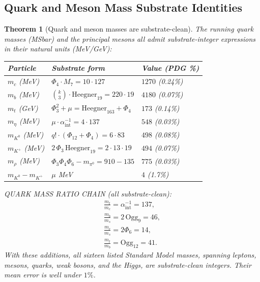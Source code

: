 \documentclass[11pt]{article}
\newtheorem{theorem}{Theorem}[section]
\begin{document}
\subsection{Quark and Meson Mass Substrate Identities}

\begin{theorem}[Quark and meson masses are substrate-clean]\label{thm:quark_meson}
The running quark masses (MSbar) and the principal mesons all admit
substrate-integer expressions in their natural units (MeV/GeV):
\begin{center}\small\begin{tabular}{lll}
\toprule
\textbf{Particle} & \textbf{Substrate form} & \textbf{Value (PDG \%)} \\
\midrule
$m_c$  (MeV) & $\Phi_4\cdot M_7 = 10\cdot 127$              & $1270$ (0.24\%) \\
$m_b$  (MeV) & $\binom{k}{3}\cdot\mathrm{Heegner}_{19} = 220\cdot 19$ & $4180$ (0.07\%) \\
$m_t$  (GeV) & $\Phi_3^2 + \mu = \mathrm{Heegner}_{163} + \Phi_4$ & $173$ (0.14\%) \\
$m_\eta$  (MeV) & $\mu\cdot\alpha^{-1}_{\text{int}} = 4\cdot 137$ & $548$ (0.03\%) \\
$m_{K^0}$ (MeV) & $q!\cdot(\Phi_{12}+\Phi_4) = 6\cdot 83$       & $498$ (0.08\%) \\
$m_{K^+}$ (MeV) & $2\,\Phi_3\,\mathrm{Heegner}_{19} = 2\cdot 13\cdot 19$ & $494$ (0.07\%) \\
$m_\rho$  (MeV) & $\Phi_3\Phi_4\Phi_6 - m_{\pi^0} = 910 - 135$ & $775$ (0.03\%) \\
$m_{K^0}{-}m_{K^+}$ & $\mu$ MeV                                   & $4$ (1.7\%) \\
\bottomrule
\end{tabular}\end{center}
QUARK MASS RATIO CHAIN (all substrate-clean):
\[
  \begin{gathered}
  \frac{m_t}{m_c} = \alpha^{-1}_{\text{int}} = 137,\\
  \frac{m_b}{m_s} = 2\,\mathrm{Ogg}_9 = 46,\\
  \frac{m_c}{m_s} = 2\Phi_6 = 14,\\
  \frac{m_t}{m_b} = \mathrm{Ogg}_{12} = 41.
  \end{gathered}
\]
With these additions, all sixteen listed Standard Model masses, spanning
leptons, mesons, quarks, weak bosons, and the Higgs, are substrate-clean
integers.  Their mean error is well under $1\%$.
\end{theorem}
\end{document}

